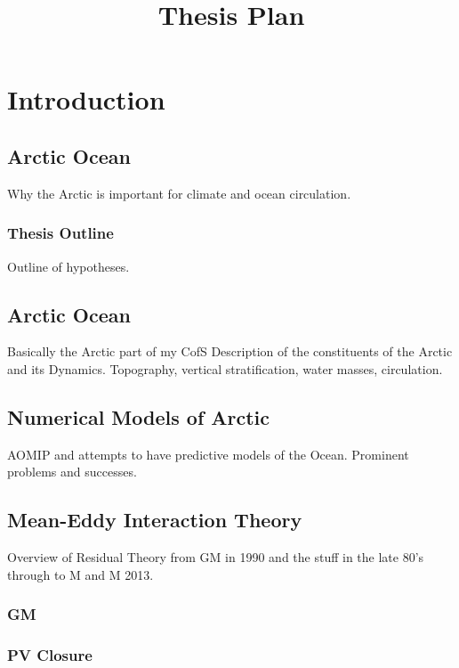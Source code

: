 \documentclass[10pt,a4paper]{article}
\title{Thesis Plan}
\begin{document}
\maketitle


\section{Introduction}

\subsection{Arctic Ocean}

Why the Arctic is important for climate and ocean circulation.

\subsubsection{Thesis Outline}

Outline of hypotheses.

\subsection{Arctic Ocean}

Basically the Arctic part of my CofS
Description of the constituents of the Arctic
and its Dynamics. Topography,
vertical stratification, water masses, circulation.

\subsection{Numerical Models of Arctic}

AOMIP and attempts to have predictive models of
the Ocean. Prominent problems and successes.

\subsection{Mean-Eddy Interaction Theory}

Overview of Residual Theory from GM in 1990 and the
stuff in the late 80's through to M and M 2013.

\subsubsection{GM}

\subsubsection{PV Closure}
\end{document}
